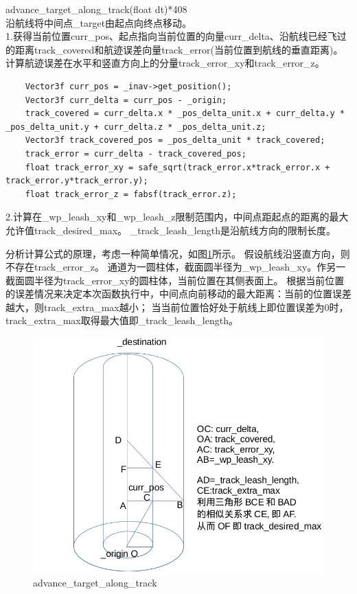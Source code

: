 \documentclass[a4paper,10pt]{ctexart} %
\begin{document}
\vspace{8pt}
\noindent advance\_target\_along\_track(float dt){\color{red}*408}\\
沿航线将中间点\_target由起点向终点移动。\\
1.获得当前位置curr\_pos、起点指向当前位置的向量curr\_delta、沿航线已经飞过的距离track\_covered和航迹误差向量track\_error(当前位置到航线的垂直距离)。计算航迹误差在水平和竖直方向上的分量track\_error\_xy和track\_error\_z。
\begin{lstlisting}
    Vector3f curr_pos = _inav->get_position();
    Vector3f curr_delta = curr_pos - _origin;
    track_covered = curr_delta.x * _pos_delta_unit.x + curr_delta.y * _pos_delta_unit.y + curr_delta.z * _pos_delta_unit.z;
    Vector3f track_covered_pos = _pos_delta_unit * track_covered;
    track_error = curr_delta - track_covered_pos;
    float track_error_xy = safe_sqrt(track_error.x*track_error.x + track_error.y*track_error.y);
    float track_error_z = fabsf(track_error.z);
\end{lstlisting}
2.计算在\_wp\_leash\_xy和\_wp\_leash\_z限制范围内，中间点距起点的距离的最大允许值track\_desired\_max。
\_track\_leash\_length是沿航线方向的限制长度。

分析计算公式的原理，考虑一种简单情况，如图\ref{advancetargetalongtrack}所示。
假设航线沿竖直方向，则不存在track\_error\_z。
通道为一圆柱体，截面圆半径为\_wp\_leash\_xy。作另一截面圆半径为track\_error\_xy的圆柱体，当前位置在其侧表面上。
根据当前位置的误差情况来决定本次函数执行中，中间点向前移动的最大距离：当前的位置误差越大，则track\_extra\_max越小；
当当前位置恰好处于航线上即位置误差为0时，track\_extra\_max取得最大值即\_track\_leash\_length。
\begin{figure}[!htb]\center
\includegraphics[scale=0.4]{advance_target_along_track.png}
\caption{advance\_target\_along\_track}\label{advancetargetalongtrack}
\end{figure}
\end{document}
